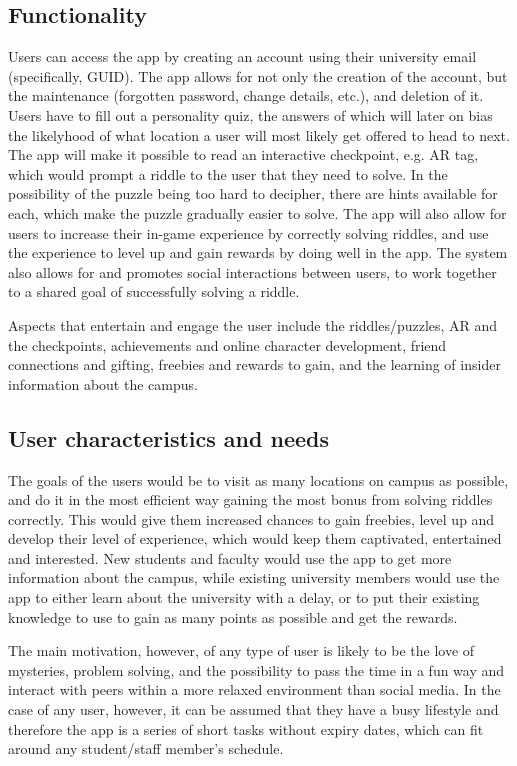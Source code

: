 \documentclass[10pt,twocolumn]{article} %
\begin{document}
\subsection*{Functionality}
Users can access the app by creating an account using their university email (specifically, GUID). The app allows for not only the creation of the account, but the maintenance (forgotten password, change details, etc.), and deletion of it. Users have to fill out a personality quiz, the answers of which will later on bias the likelyhood of what location a user will most likely get offered to head to next. The app will make it possible to read an interactive checkpoint, e.g. AR tag, which would prompt a riddle to the user that they need to solve. In the possibility of the puzzle being too hard to decipher, there are hints available for each, which make the puzzle gradually easier to solve. The app will also allow for users to increase their in-game experience by correctly solving riddles, and use the experience to level up and gain rewards by doing well in the app. The system also allows for and promotes social interactions between users, to work together to a shared goal of successfully solving a riddle.

Aspects that entertain and engage the user include the riddles/puzzles, AR and the checkpoints, achievements and online character development, friend connections and gifting, freebies and rewards to gain, and the learning of insider information about the campus.

\subsection*{User characteristics and needs}
The goals of the users would be to visit as many locations on campus as possible, and do it in the most efficient way gaining the most bonus from solving riddles correctly. This would give them increased chances to gain freebies, level up and develop their level of experience, which would keep them captivated, entertained and interested. New students and faculty would use the app to get more information about the campus, while existing university members would use the app to either learn about the university with a delay, or to put their existing knowledge to use to gain as many points as possible and get the rewards.

The main motivation, however, of any type of user is likely to be the love of mysteries, problem solving, and the possibility to pass the time in a fun way and interact with peers within a more relaxed environment than social media. In the case of any user, however, it can be assumed that they have a busy lifestyle and therefore the app is a series of short tasks without expiry dates, which can fit around any student/staff member's schedule.
\end{document}
